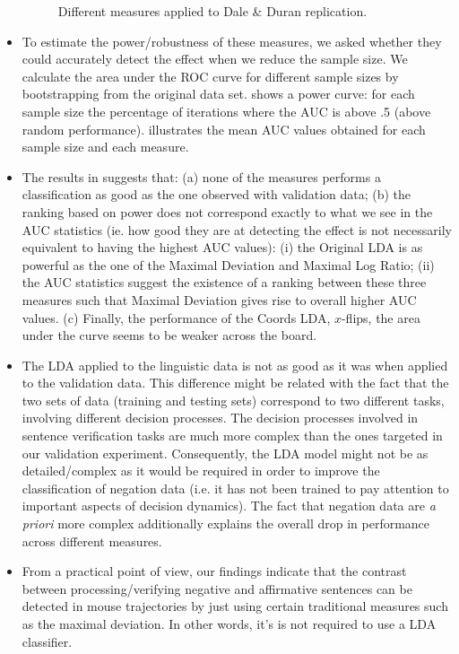 \documentclass{article}
\begin{document}
\begin{itemize}
\begin{figure}
\caption{Different measures applied to Dale \& Duran replication.}
\label{fig:different.measures.2}

\end{figure}

\item To estimate the power/robustness of these measures, we asked whether they could accurately detect the effect when we reduce the sample size. 
We calculate the area under the ROC curve for different sample sizes by bootstrapping from the original data set.  shows a power curve: for each sample size the percentage of iterations where the AUC is above .5 (above random performance).  illustrates the mean AUC values obtained for each sample size and each measure. 

\item The results in  suggests that: 
(a) none of the measures performs a classification as good as the one observed with validation data;  
(b) the ranking based on power does not correspond exactly to what we see in the AUC statistics (ie. how good they are at detecting the effect is not necessarily equivalent to having the highest AUC values):  
(i) the Original LDA is as powerful as the one of the Maximal Deviation and Maximal Log Ratio;
(ii) the AUC statistics suggest the existence of a ranking between these three measures such that Maximal Deviation gives rise to overall higher AUC values.  
(c) Finally, the performance of the Coords LDA, $x$-flips, the area under the curve seems to be weaker across the board. 

\item The LDA applied to the linguistic data is not as good as it was when applied to the validation data. This difference might be related with the fact that the two sets of data (training and testing sets) correspond to two different tasks, involving different decision processes. The decision processes involved in sentence verification tasks are much more complex than the ones targeted in our validation experiment. Consequently, the LDA model might not be as detailed/complex as it would be required in order to improve the classification of negation data (i.e. it has not been trained to pay attention to important aspects of decision dynamics). The fact that negation data are \textit{a priori} more complex additionally explains the overall drop in performance across different measures.  

\item From a practical point of view, our findings indicate that the contrast between processing/verifying negative and affirmative sentences can be detected in mouse trajectories by just using certain traditional measures such as the maximal deviation. In other words, it's is not required to use a LDA classifier. 



\end{itemize}
\end{document}
